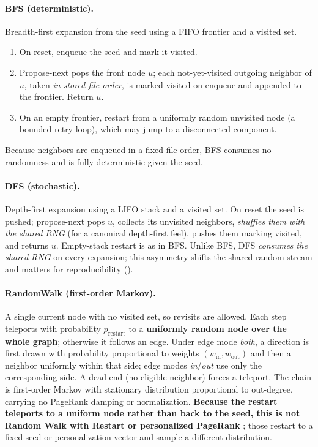 \paragraph{BFS (deterministic).}
Breadth-first expansion from the seed using a FIFO frontier and a visited set.
\begin{enumerate}
  \item On reset, enqueue the seed and mark it visited.
  \item Propose-next pops the front node $u$; each not-yet-visited outgoing neighbor
    of $u$, taken \emph{in stored file order}, is marked visited on enqueue and
    appended to the frontier. Return $u$.
  \item On an empty frontier, restart from a uniformly random unvisited node (a bounded
    retry loop), which may jump to a disconnected component.
\end{enumerate}
Because neighbors are enqueued in a fixed file order, BFS consumes no randomness and is
fully deterministic given the seed.

\paragraph{DFS (stochastic).}
Depth-first expansion using a LIFO stack and a visited set. On reset the seed is pushed;
propose-next pops $u$, collects its unvisited neighbors, \emph{shuffles them with the
shared RNG} (for a canonical depth-first feel), pushes them marking visited, and returns
$u$. Empty-stack restart is as in BFS. Unlike BFS, DFS \emph{consumes the shared RNG} on
every expansion; this asymmetry shifts the shared random stream and matters for
reproducibility ().

\paragraph{RandomWalk (first-order Markov).}
A single current node with no visited set, so revisits are allowed. Each step teleports
with probability $p_\text{restart}$ to a \textbf{uniformly random node over the whole
graph}; otherwise it follows an edge. Under edge mode \emph{both}, a direction is first
drawn with probability proportional to weights $(w_\text{in}, w_\text{out})$ and then a
neighbor uniformly within that side; edge modes \emph{in}/\emph{out} use only the
corresponding side. A dead end (no eligible neighbor) forces a teleport. The chain is
first-order Markov with stationary distribution proportional to out-degree, carrying no
PageRank damping or normalization. \textbf{Because the restart teleports to a uniform
node rather than back to the seed, this is not Random Walk with Restart or personalized
PageRank} \citep{page1999pagerank,tong2006rwr}; those restart to a fixed seed or
personalization vector and sample a different distribution.

